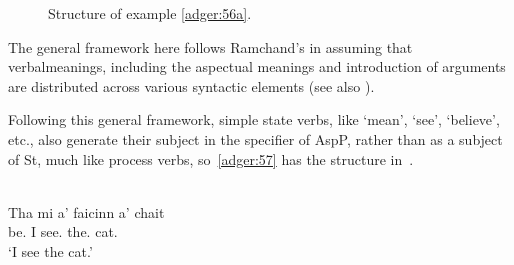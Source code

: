 \documentclass[output=paper]{langsci/langscibook}
\begin{document}
\begin{figure}
\caption{Structure of example \eqref{adger:56a}.\label{ag-tree}}
\end{figure}

The general framework here follows Ramchand's in assuming that verbal\linebreak meanings,
including the aspectual meanings and introduction of arguments are distributed
across various syntactic elements (see also \citealt{Borer2005}).

Following this general framework, simple state verbs, like `mean', `see', `believe', etc., also generate their
subject in the specifier of AspP, rather than as a subject of St, much like
process verbs, so~\eqref{adger:57} has the structure in~.\pagebreak

\ea {}\label{adger:57}\\
\gll Tha mi a' faicinn a' chait\\
be.\Prs{} I \Simp{} see.\Vn{} the.\Gen{} cat.\Gen{}\\
\glt \enquote*{I see the cat.}
\z
\end{document}
